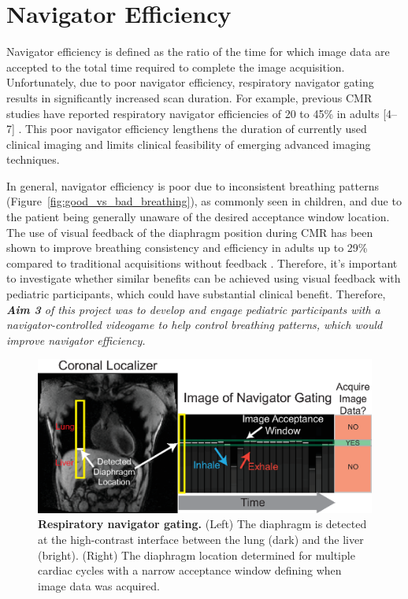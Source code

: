 \section{Navigator Efficiency}
	Navigator efficiency is defined as the ratio of the time for which image data are accepted to the total time required to complete the image acquisition. Unfortunately, due to poor navigator efficiency, respiratory navigator gating results in significantly increased scan duration. For example, previous CMR studies have reported respiratory navigator efficiencies of 20 to 45\% in adults [4–7] \cite{Abd-Elmoniem2011,Feuerlein2009,Jhooti2011,Wang1996}. This poor navigator efficiency lengthens the duration of currently used clinical imaging and limits clinical feasibility of emerging advanced imaging techniques.
	
	In general, navigator efficiency is poor due to inconsistent breathing patterns \cite{Liu1993,Wang1995a,Taylor1997a} (Figure~\ref{fig:good_vs_bad_breathing}), as commonly seen in children, and due to the patient being generally unaware of the desired acceptance window location. The use of visual feedback of the diaphragm position during CMR has been shown to improve breathing consistency and efficiency in adults up to 29\% compared to traditional acquisitions without feedback \cite{Feuerlein2009,Jhooti2011}. Therefore, it's important to investigate whether similar benefits can be achieved using visual feedback with pediatric participants, which could have substantial clinical benefit. Therefore, \textit{\textbf{Aim 3} of this project was to develop and engage pediatric participants with a navigator-controlled videogame to help control breathing patterns, which would improve navigator efficiency.}
	
	\begin{figure}
		\centering
		\includegraphics{figures/intro/navigator_gating_explanation}
		\caption[Respiratory navigator gating]{\textbf{Respiratory navigator gating.} (Left) The diaphragm is detected at the high-contrast interface between the lung (dark) and the liver (bright). (Right) The diaphragm location determined for multiple cardiac cycles with a narrow acceptance window	defining when image data was acquired.}
		\label{fig:navigator_gating_explanation}
	\end{figure}

